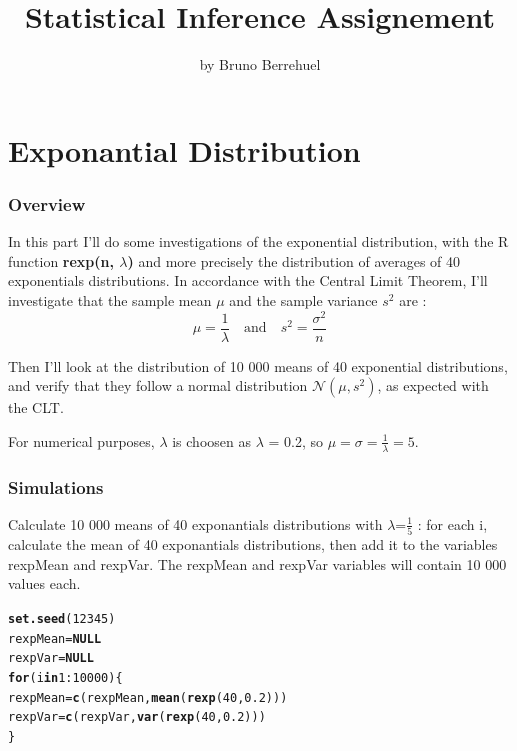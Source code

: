 \documentclass[a4paper, 10pt]{article}\usepackage[]{graphicx}\usepackage[]{color}
\makeatletter
\newcommand{\hlnum}[1]{\textcolor[rgb]{0.686,0.059,0.569}{#1}}%
\newcommand{\hlopt}[1]{\textcolor[rgb]{0,0,0}{#1}}%
\newcommand{\hlstd}[1]{\textcolor[rgb]{0.345,0.345,0.345}{#1}}%
\newcommand{\hlkwa}[1]{\textcolor[rgb]{0.161,0.373,0.58}{\textbf{#1}}}%
\newcommand{\hlkwb}[1]{\textcolor[rgb]{0.69,0.353,0.396}{#1}}%
\newcommand{\hlkwd}[1]{\textcolor[rgb]{0.737,0.353,0.396}{\textbf{#1}}}%
\newenvironment{kframe}{%
 \def\at@end@of@kframe{}%
 \ifinner\ifhmode%
  \def\at@end@of@kframe{\end{minipage}}%
  \begin{minipage}{\columnwidth}%
 \fi\fi%
 \def\FrameCommand##1{\hskip\@totalleftmargin \hskip-\fboxsep
 \colorbox{shadecolor}{##1}\hskip-\fboxsep
     \hskip-\linewidth \hskip-\@totalleftmargin \hskip\columnwidth}%
 \MakeFramed {\advance\hsize-\width
   \@totalleftmargin\z@ \linewidth\hsize
   \@setminipage}}%
 {\par\unskip\endMakeFramed%
 \at@end@of@kframe}
\newenvironment{knitrout}{}{} %
\makeatother
\begin{document}
\title{Statistical Inference Assignement}
\author{by Bruno Berrehuel}

\maketitle
\hrulefill{}
\tableofcontents

\makeatletter
{}
\makeatother

\newpage
\part{Exponantial Distribution}
\section{Overview}

In this part I'll do some investigations of the exponential distribution, with the R function \textbf{rexp(n, $\lambda$)} and more precisely the distribution of averages of 40 exponentials distributions.
In accordance with the Central Limit Theorem, I'll investigate that the sample mean $\mu$ and the sample variance $s^2$ are :
\begin{displaymath}
    \mu = \frac{1}{\lambda} \quad\mbox{and}\quad s^2 = \frac{\sigma^2}{n}
\end{displaymath}

Then I'll look at the distribution of 10 000 means of 40 exponential distributions, and verify that they follow a  normal distribution $\mathcal{N}(\mu,s^2)$, as expected with the CLT.

\noindent
For numerical purposes, $\lambda$ is choosen as $\lambda$ = 0.2, so $\mu = \sigma = \frac{1}{\lambda} = 5$.

\section{Simulations}

Calculate 10 000 means of 40 exponantials distributions with $\lambda$=$\frac{1}{5}$ : for each i, calculate the mean of 40 exponantials distributions, then add it to the variables rexpMean and rexpVar. The rexpMean and rexpVar variables will contain 10 000 values each.

\begin{knitrout}\small
{}\color{fgcolor}\begin{kframe}
\begin{alltt}
\hlkwd{set.seed}\hlstd{(}\hlnum{12345}\hlstd{)}
\hlstd{rexpMean}\hlkwb{=}\hlkwa{NULL}
\hlstd{rexpVar}\hlkwb{=}\hlkwa{NULL}
\hlkwa{for} \hlstd{(i} \hlkwa{in} \hlnum{1}\hlopt{:}\hlnum{10000}\hlstd{) \{}
    \hlstd{rexpMean} \hlkwb{=} \hlkwd{c}\hlstd{(rexpMean,} \hlkwd{mean}\hlstd{(}\hlkwd{rexp}\hlstd{(}\hlnum{40}\hlstd{,}\hlnum{0.2}\hlstd{)))}
    \hlstd{rexpVar} \hlkwb{=} \hlkwd{c}\hlstd{(rexpVar,} \hlkwd{var}\hlstd{(}\hlkwd{rexp}\hlstd{(}\hlnum{40}\hlstd{,}\hlnum{0.2}\hlstd{)))}
\hlstd{\}}
\end{alltt}
\end{kframe}
\end{knitrout}
\end{document}
